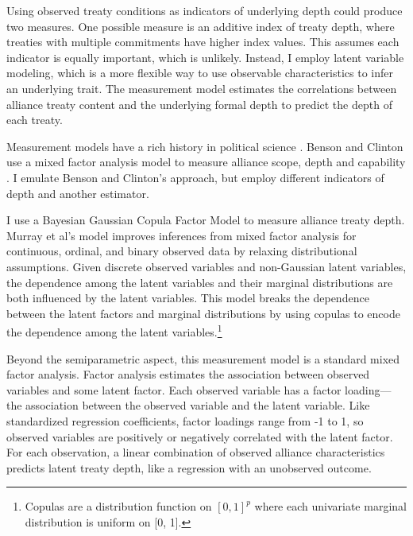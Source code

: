\documentclass[12pt]{article}
\begin{document}
Using observed treaty conditions as indicators of underlying depth could produce two measures. 
One possible measure is an additive index of treaty depth, where treaties with multiple commitments have higher index values. 
This assumes each indicator is equally important, which is unlikely. 
Instead, I employ latent variable modeling, which is a more flexible way to use observable characteristics to infer an underlying trait.  
The measurement model estimates the correlations between alliance treaty content and the underlying formal depth to predict the depth of each treaty. 


Measurement models have a rich history in political science \citep{Clintonetal2004, TreierJackman2008, Fariss2014}.
Benson and Clinton use a mixed factor analysis model to measure alliance scope, depth and capability \citep{BensonClinton2016, Quinn2004}.  
I emulate Benson and Clinton's approach, but employ different indicators of depth and another estimator. 


I use a Bayesian Gaussian Copula Factor Model \citep{Murrayetal2013} to measure alliance treaty depth. 
Murray et al's model improves inferences from mixed factor analysis for continuous, ordinal, and binary observed data by relaxing distributional assumptions. 
Given discrete observed variables and non-Gaussian latent variables, the dependence among the latent variables and their marginal distributions are both influenced by the latent variables.
This model breaks the dependence between the latent factors and marginal distributions by using copulas to encode the dependence among the latent variables.\footnote{Copulas are a distribution function on $[0, 1]^p$ where each univariate marginal distribution is uniform on [0, 1].}


Beyond the semiparametric aspect, this measurement model is a standard mixed factor analysis.
Factor analysis estimates the association between observed variables and some latent factor.
Each observed variable has a factor loading--- the association between the observed variable and the latent variable.  
Like standardized regression coefficients, factor loadings range from -1 to 1, so observed variables are positively or negatively correlated with the latent factor.  
For each observation, a linear combination of observed alliance characteristics predicts latent treaty depth, like a regression with an unobserved outcome.  
\end{document}
